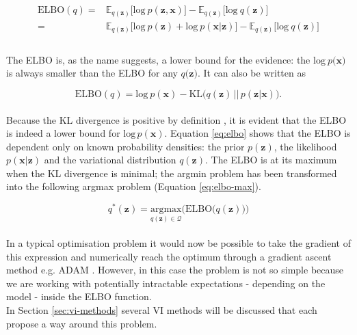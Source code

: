 {    \begin{equation}
        \label{eq:elbo}
        \begin{split}
            \mathrm{ELBO}(q)
            = &  
            \mathbb{E}_{q(\bm{z})} \big[ \mathrm{log} \: p(\bm{z},\bm{x}) \big] -
            \mathbb{E}_{q(\bm{z})} \big[ \mathrm{log} \: q(\bm{z}) \big] \\
            = & 
            \mathbb{E}_{q(\bm{z})} \big[ \mathrm{log} \: p(\bm{z}) + \mathrm{log} \: p(\bm{x}|\bm{z}) \big] - 
            \mathbb{E}_{q(\bm{z})} \big[ \mathrm{log} \: q(\bm{z}) \big] \\
        \end{split}
    \end{equation}
    \\ The ELBO is, as the name suggests, a lower bound for the evidence: the $ \mathrm{log} \: p(\bm{x)}$ is always smaller than the ELBO for any $q(\bm{z)}$. It can also be written as 
    
    \begin{equation}
       \mathrm{ELBO}(q)
        = 
        \mathrm{log} \: p(\bm{x}) - \mathrm{KL} \big( q(\bm{z}) \, || \, p(\bm{z}|\bm{x}) \big)
        .
    \end{equation}
    \\
    Because the KL divergence is positive by definition \parencite{KL}, it is evident that the ELBO is indeed a lower bound for $\mathrm{log} \, p(\bm{x})$. Equation \ref{eq:elbo} shows that the ELBO is dependent only on known probability densities: the prior $p(\bm{z})$, the likelihood $p(\bm{x}|\bm{z})$ and the variational distribution $q(\bm{z})$. The ELBO is at its maximum when the KL divergence is minimal; the argmin problem has been transformed into the following argmax problem (Equation \ref{eq:elbo-max}).
    
    \begin{equation}
        \label{eq:elbo-max}
        q^*(\bm{z}) = \underset{q(\bm{z}) \in \mathcal{Q}}{\mathrm{argmax}} \Big( \mathrm{ELBO} \big( q(\bm{z}) \big) \Big)
    \end{equation}
    \\
    In a typical optimisation problem it would now be possible to take the gradient of this expression and numerically reach the optimum through a gradient ascent method e.g. ADAM \parencite{ADAM}. However, in this case the problem is not so simple because we are working with potentially intractable expectations - depending on the model - inside the ELBO function.
    \\ 
    In Section \ref{sec:vi-methods} several VI methods will be discussed that each propose a way around this problem.
}


